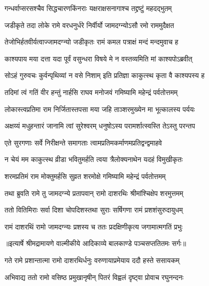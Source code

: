 \twolineshloka
{गन्धर्वाप्सरसश्चैव सिद्धचारणकिंनराः}
{यक्षराक्षसनागाश्च तद्द्रष्टुं महदद्भुतम्} %

\twolineshloka
{जडीकृते तदा लोके रामे वरधनुर्धरे}
{निर्वीर्यो जामदग्न्योऽसौ रमो राममुदैक्षत} %

\twolineshloka
{तेजोभिर्हतवीर्यत्वाज्जामदग्न्यो जडीकृतः}
{रामं कमल पत्राक्षं मन्दं मन्दमुवाच ह} %

\twolineshloka
{काश्यपाय मया दत्ता यदा पूर्वं वसुन्धरा}
{विषये मे न वस्तव्यमिति मां काश्यपोऽब्रवीत्} %

\twolineshloka
{सोऽहं गुरुवचः कुर्वन्पृथिव्यां न वसे निशाम्}
{इति प्रतिज्ञा काकुत्स्थ कृता वै काश्यपस्य ह} %

\twolineshloka
{तदिमां त्वं गतिं वीर हन्तुं नार्हसि राघव}
{मनोजवं गमिष्यामि महेन्द्रं पर्वतोत्तमम्} %

\twolineshloka
{लोकास्त्वप्रतिमा राम निर्जितास्तपसा मया}
{जहि ताञ्शरमुख्येन मा भूत्कालस्य पर्ययः} %

\twolineshloka
{अक्षय्यं मधुहन्तारं जानामि त्वां सुरेश्वरम्}
{धनुषोऽस्य परामर्शात्स्वस्ति तेऽस्तु परन्तप} %

\twolineshloka
{एते सुरगणाः सर्वे निरीक्षन्ते समागताः}
{त्वामप्रतिमकर्माणमप्रतिद्वन्द्वमाहवे} %

\twolineshloka
{न चेयं मम काकुत्स्थ व्रीडा भवितुमर्हति}
{त्वया त्रैलोक्यनाथेन यदहं विमुखीकृतः} %

\twolineshloka
{शरमप्रतिमं राम मोक्तुमर्हसि सुव्रत}
{शरमोक्षे गमिष्यामि महेन्द्रं पर्वतोत्तमम्} %

\twolineshloka
{तथा ब्रुवति रामे तु जामदग्न्ये प्रतापवान्}
{रामो दाशरथिः श्रीमांश्चिक्षेप शरमुत्तमम्} %

\twolineshloka
{ततो वितिमिराः सर्वा दिशा चोपदिशस्तथा}
{सुराः सर्षिगणा रामं प्रशशंसुरुदायुधम्} %

\twolineshloka
{रामं दाशरथिं रामो जामदग्न्यः प्रशस्य च}
{ततः प्रदक्षिणीकृत्य जगामात्मगतिं प्रभुः} %


{॥इत्यार्षे श्रीमद्रामायणे वाल्मीकीये आदिकाव्ये बालकाण्डे पञ्चसप्ततितमः सर्गः॥}


\twolineshloka
{गते रामे प्रशान्तात्मा रामो दाशरथिर्धनुः}
{वरुणायाप्रमेयाय ददौ हस्ते ससायकम्} %

\twolineshloka
{अभिवाद्य ततो रामो वसिष्ठ प्रमुखानृषीन्}
{पितरं विह्वलं दृष्ट्वा प्रोवाच रघुनन्दनः} %

